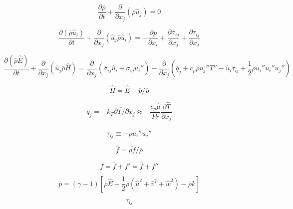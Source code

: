 

\begin{equation}
\frac{\partial \overline\rho}{\partial t} + \frac{\partial}{\partial x_j}
(\overline\rho \hat u_j) = 0
\end{equation}

\begin{equation}
\frac{\partial (\overline\rho \hat u_i)}{\partial t} +
\frac{\partial}{\partial x_j}(\hat u_j \overline\rho \hat u_i) =
-\frac{\partial p}{\partial x_i} + \frac{\partial \overline\sigma_{ij}}{\partial x_j}
+\frac{\partial \tau_{ij}}{\partial x_j}
\end{equation}

\begin{equation}
\frac{\partial (\overline\rho \hat E)}{\partial t} +
\frac{\partial}{\partial x_j}(\hat u_j \overline\rho \hat H) =
\frac{\partial}{\partial x_j} ( \overline \sigma_{ij} \hat u_i + \overline{\sigma_{ij} u_i''})
-\frac{\partial}{\partial x_j} ( \overline q_j +
c_p \overline {\rho u_j'' T''} - \hat u_i \tau_{ij} +
\frac{1}{2} \overline{\rho u_i'' u_i'' u_j''})
\end{equation}

\begin{equation}
\hat H = \hat E + \overline p / \overline\rho
\end{equation}

\begin{equation}
\overline q_j = -\overline{k_T \partial T/\partial x_j}
\approx -\frac{c_p \hat \mu}{Pr} \frac{\partial \hat T}{\partial x_j}
\end{equation}

\begin{equation}
\tau_{ij} \equiv -\overline {\rho u_i''u_j''}
\end{equation}

\begin{equation}
\hat f = \overline{\rho f}/\overline\rho
\end{equation}

\begin{equation}
f = \overline f + f' = \hat f + f''
\end{equation}

\begin{equation}
\overline p = (\gamma - 1)[\overline\rho \hat E -
\frac{1}{2}\overline\rho ( \hat u^2 + \hat v^2 + \hat w^2) - \overline\rho k]
\end{equation}

\begin{equation}
\tau_{ij}
\end{equation}

